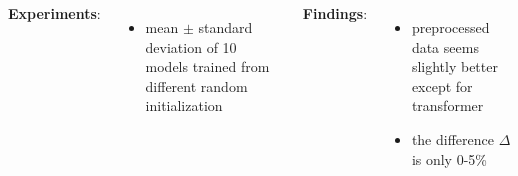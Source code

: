\begin{frame}
{\begin{tabular}{rccccc}
	\bottomrule
\end{tabular}

}
\vspace{1em}

\begin{columns}[t]
	
	\textbf{Experiments}:
	\begin{itemize}
		\item mean $\pm$ standard deviation of 10 models trained from different random initialization
	\end{itemize}
	
	
	\textbf{Findings}:
	\begin{itemize}
		\item preprocessed data seems slightly better except for transformer
		\item the difference $\Delta$ is only 0-5\%
	\end{itemize}
	

\end{columns}


\end{frame}
